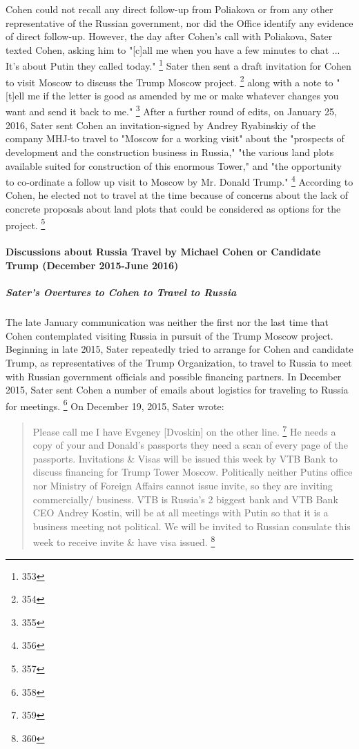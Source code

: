 Cohen could not recall any direct follow-up from Poliakova or from any other representative of the Russian government, nor did the Office identify any evidence of direct follow-up.
However, the day after Cohen's call with Poliakova, Sater texted Cohen, asking him to "[c]all me when you have a few minutes to chat ... It's about Putin they called today."%
\footnote{353}
Sater then sent a draft invitation for Cohen to visit Moscow to discuss the Trump Moscow project.%
\footnote{354}
along with a note to "[t]ell me if the letter is good as amended by me or make whatever changes you want and send it back to me."%
\footnote{355}
After a further round of edits, on January 25, 2016, Sater sent Cohen an invitation-signed by Andrey Ryabinskiy of the company MHJ-to travel to "Moscow for a working visit" about the "prospects of development and the construction business in Russia," "the various land plots available suited for construction of this enormous Tower," and "the opportunity to co-ordinate a follow up visit to Moscow by Mr. Donald Trump."%
\footnote{356}
According to Cohen, he elected not to travel at the time because of concerns about the lack of concrete proposals about land plots that could be considered as options for the project.%
\footnote{357}

\paragraph{Discussions about Russia Travel by Michael Cohen or Candidate Trump (December 2015-June 2016)}

\subparagraph{Sater's Overtures to Cohen to Travel to Russia}

The late January communication was neither the first nor the last time that Cohen contemplated visiting Russia in pursuit of the Trump Moscow project.
Beginning in late 2015, Sater repeatedly tried to arrange for Cohen and candidate Trump, as representatives of the Trump Organization, to travel to Russia to meet with Russian government officials and possible financing partners.
In December 2015, Sater sent Cohen a number of emails about logistics for traveling to Russia for meetings.%
\footnote{358}
On December 19, 2015, Sater wrote:

\begin{quote}
Please call me I have Evgeney [Dvoskin] on the other line.%
\footnote{359}
He needs a copy of your and Donald's passports they need a scan of every page of the passports.
Invitations \& Visas will be issued this week by VTB Bank to discuss financing for Trump Tower Moscow. Politically neither Putins office nor Ministry of Foreign Affairs cannot issue invite, so they are inviting commercially/ business.
VTB is Russia's 2 biggest bank and VTB Bank CEO Andrey Kostin, will be at all meetings with Putin so that it is a business meeting not political.
We will be invited to Russian consulate this week to receive invite \& have visa issued.%
\footnote{360}
\end{quote}

